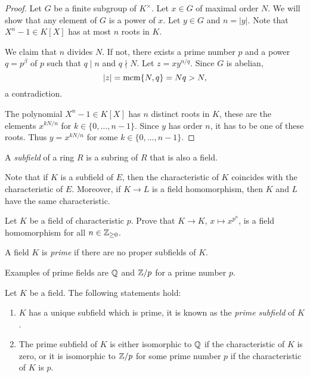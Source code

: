 \begin{proof}
    Let $G$ be a finite subgroup of $K^\times$. Let 
    $x\in G$ of maximal order $N$. We will show that any element of 
    $G$ is a power of $x$. Let $y\in G$ and $n=|y|$. 
    Note that $X^n-1\in K[X]$ has at most $n$ roots in $K$. 
    
    We claim that $n$ divides $N$. If not, there exists
    a prime number $p$ and a power $q=p^\beta$ of $p$ 
    such that 
    $q\mid n$ and $q\nmid N$. Let $z=xy^{n/q}$. Since 
    $G$ is abelian, 
    \[
    |z|=\mathrm{mcm}\{N,q\}=Nq>N,
    \]
    a contradiction. 

    The polynomial $X^n-1\in K[X]$ has $n$ distinct roots in $K$, these are
    the elements $x^{kN/n}$ for $k\in\{0,\dots,n-1\}$. Since $y$ 
    has order $n$, it has to be one of these roots. Thus
    $y=x^{kN/n}$ for some $k\in\{0,\dots,n-1\}$. 
\end{proof}

\begin{definition}
	A \emph{subfield} of a ring $R$ is a subring of $R$ 
	that is also a field.
\end{definition}

Note that if $K$ is a subfield of $E$, then
the characteristic of $K$ coincides
with the characteristic 
of $E$. Moreover, if $K\to L$ is a field homomorphism, then
$K$ and $L$ have the same characteristic. 

\begin{exercise}
\label{xca: Frobenius hom}
	Let $K$ be a field of characteristic $p$. Prove
	that $K\to K$, $x\mapsto x^{p^n}$, is a field homomorphism
	for all $n\in\mathbb{Z}_{\geq 0}$. 
\end{exercise}

\begin{definition}
	A field $K$ is \emph{prime} if there are no
	proper subfields of $K$. 
\end{definition}

Examples of prime fields are $\mathbb{Q}$ and $\mathbb{Z}/p$ for a prime number $p$.

\begin{proposition}
	Let $K$ be a field. The following statements hold:
	\begin{enumerate}
		\item $K$ has a unique subfield which is prime, it is known as the 
			\emph{prime subfield} of $K$.
		\item The prime subfield of $K$ is either isomorphic to $\mathbb{Q}$ if 
			the characteristic of $K$ is zero, or it is isomorphic to $\mathbb{Z}/p$ for
			some prime number $p$ if the characteristic of $K$ is $p$. 
	\end{enumerate}
\end{proposition}

